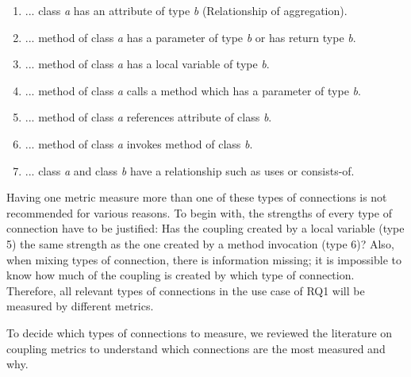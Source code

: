 \begin{enumerate}
  \item ... class \textit{a} has an attribute of type \textit{b} (Relationship of aggregation).
  \item ... method of class \textit{a} has a parameter of type \textit{b} or has return type \textit{b}.
  \item ... method of class \textit{a} has a local variable of type \textit{b}.
  \item ... method of class \textit{a} calls a method which has a parameter of type \textit{b}.
  \item ... method of class \textit{a} references attribute of class \textit{b}.
  \item ... method of class \textit{a} invokes method of class \textit{b}.
  \item ... class \textit{a} and class \textit{b} have a relationship such as uses or consists-of.
\end{enumerate}

Having one metric measure more than one of these types of connections is not recommended for various reasons. To begin with, the strengths of every type of connection have to be justified: Has the coupling created by a local variable (type 5) the same strength as the one created by a method invocation (type 6)? Also, when mixing types of connection, there is information missing; it is impossible to know how much of the coupling is created by which type of connection. Therefore, all relevant types of connections in the use case of RQ1 will be measured by different metrics.

To decide which types of connections to measure, we reviewed the literature on coupling metrics to understand which connections are the most measured and why.

